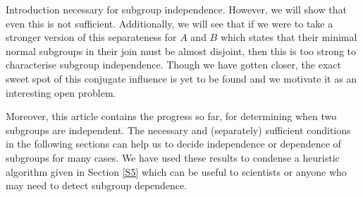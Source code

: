 \documentclass{article}
\begin{document}
\begin{section}{Introduction}
necessary for subgroup independence. However, we will show that even this is not sufficient. Additionally, we will see that if we were to take a stronger version of this separateness for $A$ and $B$ which states that their minimal normal subgroups in their join must be almost disjoint, then this is too strong to characterise subgroup independence. Though we have gotten closer, the exact sweet spot of this conjugate influence is yet to be found and we motivate it as an interesting open problem.
		
		Moreover, this article contains the progress so far, for determining when two subgroups are independent. The necessary and (separately) sufficient conditions in the following sections can help us to decide independence or dependence of subgroups for many cases. We have used these results to condense a heuristic algorithm given in Section \ref{S5} which can be useful to scientists or anyone who may need to detect subgroup dependence. \\
		
		
		
		
	\end{section} 
	
	
	
	
	
\end{document}
